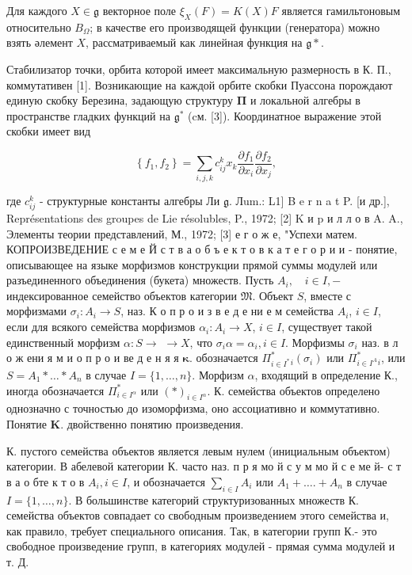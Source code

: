 \documentclass[10pt]{article}
\begin{document}
Для каждого $X \in \mathfrak{g}$ векторное поле $\xi_{X}(F)=K(X) F$ является гамильтоновым относительно $B_{\Omega}$; в качестве его производящей функции (генератора) можно взять әлемент $X$, рассматриваемый как линейная функция на $\mathfrak{g} *$.



Стабилизатор точки, орбита которой имеет максимальную размерность в К. П., коммутативен [1]. Возникающие на каждой орбите скобки Пуассона порождают единую скобку Березина, задающую структуру $\boldsymbol{\Pi}$ и локальной алгебры в пространстве гладких функций на $\mathfrak{g}^{*}$ (cм. [3]). Координатное выражение этой скобки имеет вид



\[

\left\{f_{1}, f_{2}\right\}=\sum_{i, j, k} c_{i j}^{k} x_{k} \frac{\partial f_{1}}{\partial x_{i}} \frac{\partial f_{2}}{\partial x_{j}},

\]



где $c_{i j}^{k}$ - структурные константы алгебры Ли $\mathfrak{g}$. Лum.: L1] B e r n a t P. [и др.], Représentations des groupes de Lie résolubles, P., 1972; [2] K и p и л л о в A. A., Элементы теории представлений, М., 1972; [3] е г о ж е, "Успехи матем. КОПРОИЗВЕДЕНИЕ с е м е Й с т в а о б ъ е к т о в к а т е г о р и и - понятие, описывающее на языке морфизмов конструкции прямой суммы модулей или разъединенного объединения (букета) множеств. Пусть $A_{i}, \quad i \in I,-$ индексированное семейство объектов категории $\mathfrak{M}$. Объект $S$, вместе с морфизмами $\sigma_{i}: A_{i} \rightarrow S$, наз. К о п р о и з в е д е ни е м семейства $A_{i}$, $i \in I$, если для всякого семейства морфизмов $\alpha_{i}: A_{i} \rightarrow X$, $i \in I$, существует такой единственный морфизм $\alpha: S \rightarrow$ $\rightarrow X$, что $\sigma_{i} \alpha=\alpha_{i}, i \in I$. Морфизмы $\sigma_{i}$ наз. в л о ж ени я м и о п р о и ве д е н я я $\boldsymbol{\kappa}$. обозначается $\Pi_{i \in I^{*}}^{*}{ }_{i}\left(\sigma_{i}\right)$ или $\Pi_{i \in I^{A}}^{*}{ }_{i}$, или $S=A_{1} * \ldots * A_{n}$ в случае $I=\{1, \ldots, n\}$. Морфизм $\alpha$, входящий в определение К., иногда обозначается $\Pi_{i \in I^{\alpha}}^{*}$ или $(*)_{i \in I^{\alpha}}$. К. семейства объектов определено однозначно с точностью до изоморфизма, оно ассоциативно и коммутативно. Понятие $\mathbf{K}$. двойственно понятию произведения.



К. пустого семейства объектов является левым нулем (инициальным объектом) категории. В абелевой категории К. часто наз. п р я мо й с у м мо й с е ме й- с т в а о бте к т о в $A_{i}, i \in I$, и обозначается $\sum_{i \in I} A_{i}$ или $A_{1}+\ldots .+A_{n}$ в случае $I=\{1, \ldots, n\}$. В большинстве категорий структуризованных множеств К. семейства объектов совпадает со свободным произведением этого семейства и, как правило, требует специального описания. Так, в категории групп К.- это свободное произведение групп, в категориях модулей - прямая сумма модулей и т. Д.
\end{document}
